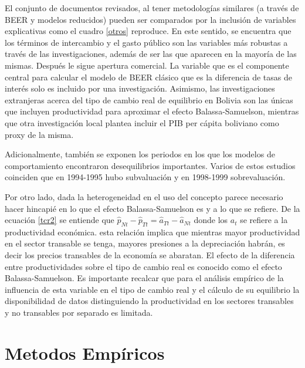 \documentclass[12pt,letterpaper]{article}
\begin{document}

El conjunto de documentos revisados, al tener metodologías similares (a través de BEER y modelos reducidos) pueden ser comparados por la inclusión de variables explicativas como el cuadro \ref{otros} reproduce. En este sentido, se encuentra que los términos de intercambio y el gasto público son las variables más robustas a través de las investigaciones, además de ser las que aparecen en la mayoría de las mismas. Después le sigue apertura comercial. La variable que es el componente central para calcular el modelo de BEER clásico que es la diferencia de tasas de interés solo es incluido por una investigación. Asimismo, las investigaciones extranjeras acerca del tipo de cambio real de equilibrio en Bolivia son las únicas que incluyen productividad para aproximar el efecto Balassa-Samuelson, mientras que otra investigación local plantea incluir el PIB per cápita boliviano como proxy de la misma.

Adicionalmente, también se exponen los periodos en los que los modelos de comportamiento encontraron desequilibrios importantes. Varios de estos estudios coinciden que en 1994-1995 hubo subvaluación y en 1998-1999 sobrevaluación. 

Por otro lado, dada la heterogeneidad en el uso del concepto parece necesario hacer hincapié en lo que el efecto Balassa-Samuelson es y a lo que se refiere. De la ecuación \ref{tcr2} se entiende que $\hat{p}_{Nt}-\hat{p}_{Tt}=\hat{a}_{Tt}-\hat{a}_{Nt}$ donde los $a_t$ se refiere a la productividad económica. esta relación implica que mientras mayor productividad en el sector transable se tenga, mayores presiones a la depreciación habrán, es decir los precios transables de la economía se abaratan. El efecto de la diferencia entre productividades sobre el tipo de cambio real es conocido como el efecto Balassa-Samuelson. Es importante recalcar que para el análisis empírico de la influencia de esta variable en el tipo de cambio real y el cálculo de su equilibrio la disponibilidad de datos distinguiendo la productividad en los sectores transables y no transables por separado es limitada. 


\section{Metodos Empíricos}\label{tcr}
\end{document}
